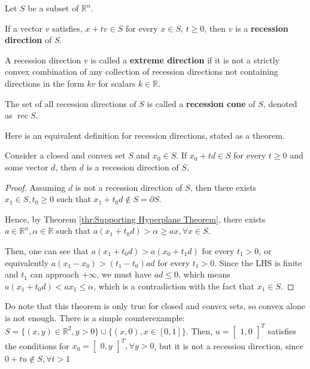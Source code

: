 \begin{definition}
  Let \( S \) be a subset of \( \mathbb{R}^{n} \).

  If a vector \( v \) satisfies, \( x + tv \in S \) for every \( x \in S \), \(
  t \ge  0\), then \( v \) is a \textbf{recession direction} of \( S \).

  A recession direction \( v \) is called a \textbf{extreme direction} if it is
  not a strictly convex combination of any collection of recession directions
  not containing directions in the form \( kv \) for scalars \( k \in \mathbb{R}
  \).

  The set of all recession directions of \( S \) is called a \textbf{recession
  cone} of \( S \), denoted as \( \operatorname{rec} S \).
\end{definition}

Here is an equivalent definition for recession directions, stated as a theorem.

\begin{theorem}
\label{thr:Recession direction only needs one point}
  Consider a closed and convex set \( S \) and \( x_{0} \in S \).
  If \( x_{0} + t d \in S \) for
  every \( t \ge  0 \) and some vector \( d \), then \( d \) is a recession
  direction of \( S \).
\end{theorem}

\begin{proof}
  Assuming \( d \) is not a recession direction of \( S \), then there exists \(
  x_{1} \in S, t_{0} \ge 0\) such that \( x_{1}+t_{0}d \notin S = \partial S \).

  Hence, by Theorem \ref{thr:Supporting Hyperplane Theorem}, there exists \( a
  \in \mathbb{R}^{n}, \alpha \in \mathbb{R} \) such that \( a(x_{1}+t_{0}d) >
  \alpha\ge ax, \forall  x\in S \).

  Then, one can see that \( a(x_{1}+t_{0}d) > a(x_{0}+t_{1}d) \) for every \(
  t_{1} > 0 \), or equivalently \( a(x_{1}-x_{0}) > (t_{1}-t_{0})ad \) for every
  \( t_{1} > 0 \). Since the LHS is finite and \( t_{1}  \) can approach \(
  +\infty \), we must have \( ad \le  0 \), which means \( a(x_{1}+t_{0}d) <
  ax_{1} \le \alpha \), which is a contradiction with the fact that \( x_{1}
  \in S \).
\end{proof}

Do note that this theorem is only true for closed and convex sets, so convex
alone is not enough. There is a simple counterexample: \( S = \{(x, y) \in
\mathbb{R}^2, y > 0\} \cup \{(x, 0), x \in [0, 1]\}    \).
Then, \( u = \begin{bmatrix} 1, 0 \end{bmatrix} ^{T} \) satisfies the conditions
for \( x_{0} = \begin{bmatrix} 0, y \end{bmatrix}^{T}, \forall y > 0 \), but it
is not a recession direction, since \( 0 + tu \notin S, \forall t > 1  \)


